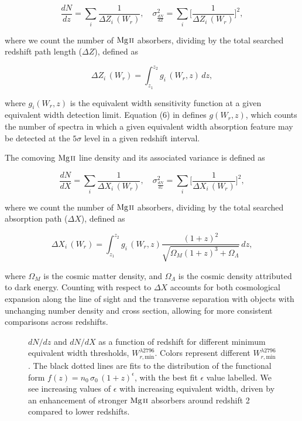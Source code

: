 \documentclass[iop,apj,numberedappendix,appendixfloats,twocolappendix]{emulateapj}
\begin{document}
\begin{equation}
\frac{d N}{d z} = \sum_{i}\frac{1}{\Delta Z_i\,(W_r)},\quad \sigma^2_{\frac{d N}{d Z}} = \sum_{i} \Big[\frac{1}{\Delta Z_i\,(W_r)}\Big]^2,
\label{eqn:dndz}
\end{equation}

\noindent
where we count the number of ${\hbox{{\rm Mg}\kern 0.1em{\sc ii}}}$ absorbers, dividing by the total searched redshift path length ($\Delta Z$), defined as

\begin{equation}
\Delta Z_i\,(W_r) = \int_{z_1}^{z_2} g_i\,(W_r, z)\,dz,
\label{eqn:deltaz}
\end{equation}

\noindent
where $g_i(W_r, z)$ is the equivalent width sensitivity function at a given equivalent width detection limit. Equation (6) in \cite{Lanzetta1987} defines $g(W_r, z)$, which counts the number of spectra in which a given equivalent width absorption feature may be detected at the $5\sigma$ level in a given redshift interval. 

The comoving ${\hbox{{\rm Mg}\kern 0.1em{\sc ii}}}$ line density and its associated variance is defined as

\begin{equation}
\frac{d N}{d X} = \sum_{i}\frac{1}{\Delta X_i\,(W_r)},\quad \sigma^2_{\frac{d N}{d z}} = \sum_{i} \Big[\frac{1}{\Delta X_i\,(W_r)}\Big]^2,
\label{eqn:dndx}
\end{equation}

\noindent
where we count the number of ${\hbox{{\rm Mg}\kern 0.1em{\sc ii}}}$ absorbers, dividing by the total searched absorption path ($\Delta X$), defined as

\begin{equation}
\Delta X_i\,(W_r) = \int_{z_1}^{z_2} g_i\,(W_r, z) \frac{(1 + z)^2}{\sqrt{\Omega_M (1 + z)^3 + \Omega_{\Lambda}}}\,dz,
\label{eqn:deltax}
\end{equation}

\noindent
where $\Omega_M$ is the cosmic matter density, and $\Omega_{\Lambda}$ is the cosmic density attributed to dark energy. Counting with respect to $\Delta X$ accounts for both cosmological expansion along the line of sight and the transverse separation with objects with unchanging number density and cross section, allowing for more consistent comparisons across redshifts. 

\begin{figure*}[bth]
\caption{$dN\!/dz$ and $dN\!/dX$ as a function of redshift for different minimum equivalent width thresholds, $W_{r,\mathrm{min}}^{\lambda2796}$. Colors represent different $W_{r,\mathrm{min}}^{\lambda2796}$. The black dotted lines are fits to the distribution of the functional form $f(z) = n_0\,\sigma_0\,(1 + z)^{\epsilon}$, with the best fit $\epsilon$ value labelled. We see increasing values of $\epsilon$ with increasing equivalent width, driven by an enhancement of stronger ${\hbox{{\rm Mg}\kern 0.1em{\sc ii}}}$ absorbers around redshift 2 compared to lower redshifts.}
\label{fig:dndz_dndx}
\end{figure*}
\end{document}
